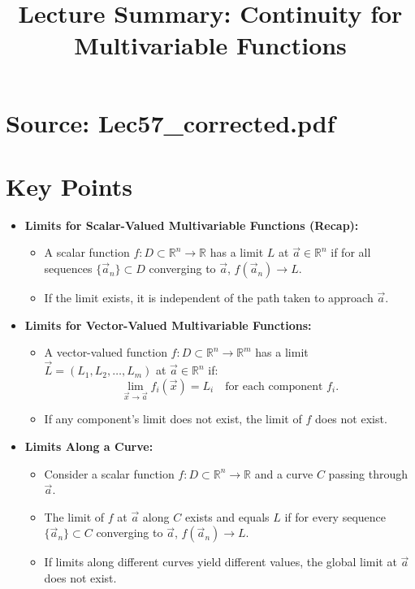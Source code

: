 \documentclass{article}
\title{Lecture Summary: Continuity for Multivariable Functions}
\author{}
\date{}
\begin{document}
\maketitle

\section*{Source: Lec57\_corrected.pdf}

\section*{Key Points}

\begin{itemize}
  \item \textbf{Limits for Scalar-Valued Multivariable Functions (Recap):}
    \begin{itemize}
      \item A scalar function $f: D \subset \mathbb{R}^n \to \mathbb{R}$ has a limit $L$ at $\vec{a} \in \mathbb{R}^n$ if for all sequences $\{\vec{a}_n\} \subset D$ converging to $\vec{a}$, $f(\vec{a}_n) \to L$.
      \item If the limit exists, it is independent of the path taken to approach $\vec{a}$.
    \end{itemize}

  \item \textbf{Limits for Vector-Valued Multivariable Functions:}
    \begin{itemize}
      \item A vector-valued function $f: D \subset \mathbb{R}^n \to \mathbb{R}^m$ has a limit $\vec{L} = (L_1, L_2, \dots, L_m)$ at $\vec{a} \in \mathbb{R}^n$ if:
        \[
          \lim_{\vec{x} \to \vec{a}} f_i(\vec{x}) = L_i \quad \text{for each component } f_i.
        \]
      \item If any component's limit does not exist, the limit of $f$ does not exist.
    \end{itemize}

  \item \textbf{Limits Along a Curve:}
    \begin{itemize}
      \item Consider a scalar function $f: D \subset \mathbb{R}^n \to \mathbb{R}$ and a curve $C$ passing through $\vec{a}$.
      \item The limit of $f$ at $\vec{a}$ along $C$ exists and equals $L$ if for every sequence $\{\vec{a}_n\} \subset C$ converging to $\vec{a}$, $f(\vec{a}_n) \to L$.
      \item If limits along different curves yield different values, the global limit at $\vec{a}$ does not exist.
    \end{itemize}


\end{itemize}
\end{document}
